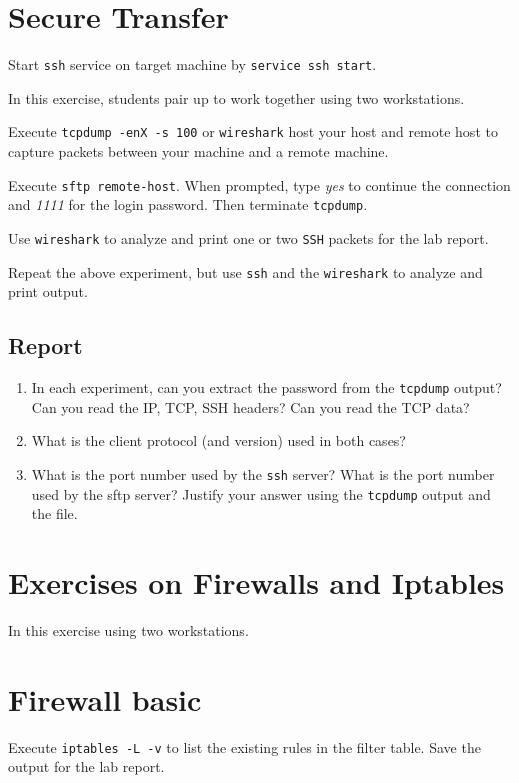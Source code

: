 \documentclass{../UTNetLab}
\begin{document}
\section{Secure Transfer}
	Start \lstinline{ssh} service on target machine by \lstinline{service ssh start}.

		In this exercise, students pair up to work together using two workstations.
	
	Execute \lstinline{tcpdump -enX -s 100} or \lstinline{wireshark} host your host and remote host to capture packets between your machine and a remote machine.

	Execute \lstinline[emph={your-host, remote-host}]{sftp remote-host}. When prompted, type \textit{yes} to continue the connection and \textit{1111} for the login password. Then terminate \lstinline{tcpdump}.

	Use \lstinline{wireshark} to analyze and print one or two \lstinline{SSH} packets for the lab report.

	Repeat the above experiment, but use \lstinline{ssh} and the \lstinline{wireshark} to analyze and print output.


	\subsection*{Report}
	\begin{enumerate}
		\item In each experiment, can you extract the password from the \lstinline{tcpdump} output? Can you read the IP, TCP, SSH headers? Can you read the TCP data?
		\item What is the client protocol (and version) used in both cases?
		\item What is the port number used by the \lstinline{ssh} server? What is the port number used by the sftp server? Justify your answer using the \lstinline{tcpdump} output and the  file.
	\end{enumerate}

\section*{Exercises on Firewalls and Iptables}
	In this exercise using two workstations.

\section{Firewall basic}
	Execute \lstinline{iptables -L -v} to list the existing rules in the filter table. Save the output for the lab report.
\end{document}
